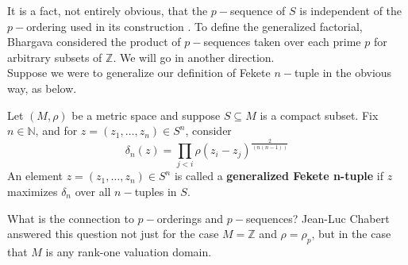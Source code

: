 It is a fact, not entirely obvious, that the $p-$sequence of $S$ is independent of the $p-$ordering used in its construction \cite{mb1}. To define the generalized factorial, Bhargava considered the product of $p-$sequences taken over each prime $p$ for arbitrary subsets of $\mathbb{Z}$.  We will go in another direction.\\

Suppose we were to generalize our definition of Fekete $n-$tuple in the obvious way, as below. 

\begin{definition}
\cite{kj} Let $(M, \rho)$ be a metric space and suppose $S \subseteq M$ is a compact subset. Fix $n \in \mathbb{N}$, and for $z = (z_1,\ldots,z_n) \in S^n$, consider
\[\delta_n(z) = \prod_{j < i} \rho(z_i - z_j)^{\frac{2}{(n(n-1))}} \]
An element $z = (z_1,\ldots,z_n) \in S^n$ is called a \textbf{generalized Fekete n-tuple} if $z$ maximizes $\delta_n$ over all $n-$tuples in $S$.
\end{definition}

What is the connection to $p-$orderings and $p-$sequences? Jean-Luc Chabert answered this question not just for the case $M=\mathbb{Z}$ and $\rho=\rho_p$, but in the case that $M$ is any rank-one valuation domain. 



